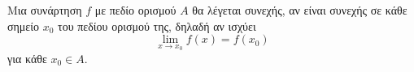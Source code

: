 Μια συνάρτηση $ f $ με πεδίο ορισμού $ A $ θα λέγεται συνεχής, αν είναι συνεχής σε κάθε σημείο $ x_0 $ του πεδίου ορισμού της, δηλαδή αν ισχύει
\[ \lim_{x\to x_0}{f(x)}=f(x_0) \]
για κάθε $ x_0\in A $.
